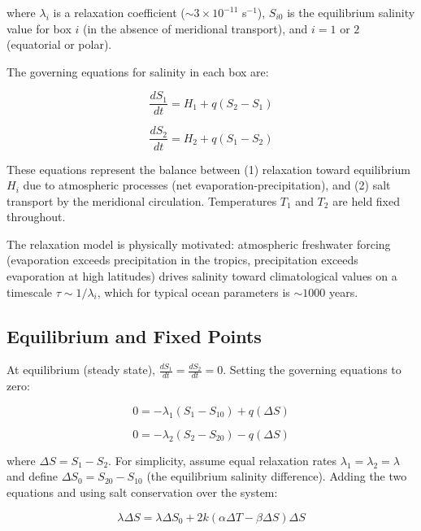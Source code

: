 \documentclass[12pt,letterpaper]{article}
\begin{document}
where $\lambda_i$ is a relaxation coefficient ($\sim 3 \times 10^{-11}$ s$^{-1}$), $S_{i0}$ is the equilibrium salinity value for box $i$ (in the absence of meridional transport), and $i = 1$ or $2$ (equatorial or polar).

The governing equations for salinity in each box are:

\begin{equation}
\frac{dS_1}{dt} = H_1 + q(S_2 - S_1)
\end{equation}

\begin{equation}
\frac{dS_2}{dt} = H_2 + q(S_1 - S_2)
\end{equation}

These equations represent the balance between (1) relaxation toward equilibrium $H_i$ due to atmospheric processes (net evaporation-precipitation), and (2) salt transport by the meridional circulation. Temperatures $T_1$ and $T_2$ are held fixed throughout.

The relaxation model is physically motivated: atmospheric freshwater forcing (evaporation exceeds precipitation in the tropics, precipitation exceeds evaporation at high latitudes) drives salinity toward climatological values on a timescale $\tau \sim 1/\lambda_i$, which for typical ocean parameters is $\sim 1000$ years.

\subsection{Equilibrium and Fixed Points}

At equilibrium (steady state), $\frac{dS_1}{dt} = \frac{dS_2}{dt} = 0$. Setting the governing equations to zero:

\begin{equation}
0 = -\lambda_1(S_1 - S_{10}) + q(\Delta S)
\end{equation}

\begin{equation}
0 = -\lambda_2(S_2 - S_{20}) - q(\Delta S)
\end{equation}

where $\Delta S = S_1 - S_2$. For simplicity, assume equal relaxation rates $\lambda_1 = \lambda_2 = \lambda$ and define $\Delta S_0 = S_{20} - S_{10}$ (the equilibrium salinity difference). Adding the two equations and using salt conservation over the system:

\begin{equation}
\lambda \Delta S = \lambda \Delta S_0 + 2k(\alpha\Delta T - \beta\Delta S)\Delta S
\end{equation}
\end{document}

